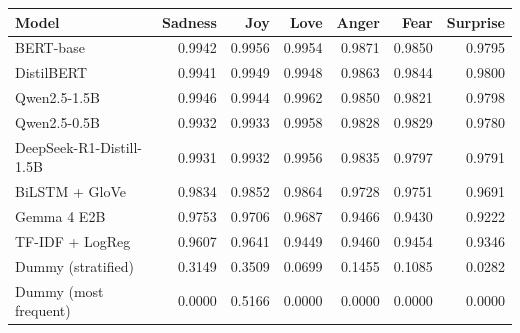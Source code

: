 \begin{tabular}{@{}lrrrrrr@{}}
\toprule
Model & Sadness & Joy & Love & Anger & Fear & Surprise \\
\midrule
BERT-base & 0.9942 & 0.9956 & 0.9954 & 0.9871 & 0.9850 & 0.9795 \\
DistilBERT & 0.9941 & 0.9949 & 0.9948 & 0.9863 & 0.9844 & 0.9800 \\
Qwen2.5-1.5B & 0.9946 & 0.9944 & 0.9962 & 0.9850 & 0.9821 & 0.9798 \\
Qwen2.5-0.5B & 0.9932 & 0.9933 & 0.9958 & 0.9828 & 0.9829 & 0.9780 \\
DeepSeek-R1-Distill-1.5B & 0.9931 & 0.9932 & 0.9956 & 0.9835 & 0.9797 & 0.9791 \\
BiLSTM + GloVe & 0.9834 & 0.9852 & 0.9864 & 0.9728 & 0.9751 & 0.9691 \\
Gemma 4 E2B & 0.9753 & 0.9706 & 0.9687 & 0.9466 & 0.9430 & 0.9222 \\
TF-IDF + LogReg & 0.9607 & 0.9641 & 0.9449 & 0.9460 & 0.9454 & 0.9346 \\
Dummy (stratified) & 0.3149 & 0.3509 & 0.0699 & 0.1455 & 0.1085 & 0.0282 \\
Dummy (most frequent) & 0.0000 & 0.5166 & 0.0000 & 0.0000 & 0.0000 & 0.0000 \\
\bottomrule
\end{tabular}
